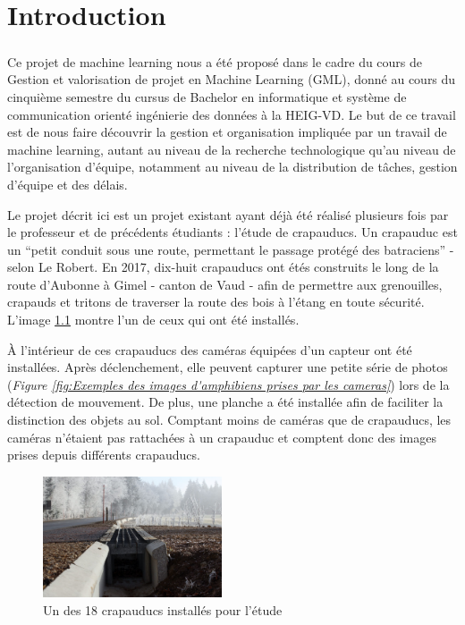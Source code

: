 \chapter{Introduction}
\paragraph*{}
Ce projet de machine learning nous a été proposé dans le cadre du cours de Gestion et valorisation de projet en Machine Learning (GML), donné au cours du cinquième semestre du cursus de Bachelor en informatique et système de communication orienté ingénierie des données à la HEIG-VD. Le but de ce travail est de nous faire découvrir la gestion et organisation impliquée par un travail de machine learning, autant au niveau de la recherche technologique qu'au niveau de l'organisation d'équipe, notamment au niveau de la distribution de tâches, gestion d'équipe et des délais. \newline

Le projet décrit ici est un projet existant ayant déjà été réalisé plusieurs fois par le professeur et de précédents étudiants : l'étude de crapauducs. Un crapauduc est un “petit conduit sous une route, permettant le passage protégé des batraciens” - selon Le Robert. En 2017, dix-huit crapauducs ont étés construits le long de la route d'Aubonne à Gimel - canton de Vaud - afin de permettre aux grenouilles, crapauds et tritons de traverser la route des bois à l'étang en toute sécurité. L'image \ref{fig:Un des 18 crapauducs installés pour l'étude} montre l'un de ceux qui ont été installés. \newline

À l'intérieur de ces crapauducs des caméras équipées d'un capteur ont été installées. Après déclenchement, elle peuvent capturer une petite série de photos (\textit{Figure \ref{fig:Exemples des images d'amphibiens prises par les cameras}}) lors de la détection de mouvement. De plus, une planche a été installée afin de faciliter la distinction des objets au sol. Comptant moins de caméras que de crapauducs, les caméras n'étaient pas rattachées à un crapauduc et comptent donc des images prises depuis différents crapauducs.\newline

\begin{figure}[!htb]
    \centering
    \includegraphics[width=200px]{images/introduction_crapauduc_exterieur.png}
    \caption{Un des 18 crapauducs installés pour l'étude}
    \label{fig:Un des 18 crapauducs installés pour l'étude}
\end{figure}

